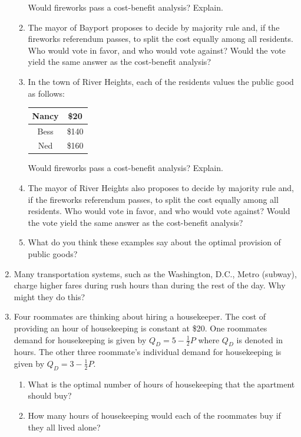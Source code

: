 \documentclass{article}
\begin{document}
\begin{enumerate}
\begin{enumerate}
	Would fireworks pass a cost-benefit analysis? Explain. 
	
	\item The mayor of Bayport proposes to decide by majority rule and, if the fireworks referendum passes, to split the cost equally among all residents. Who would vote in favor, and who would vote against? Would the vote yield the same answer as the cost-benefit analysis?
	
	\item In the town of River Heights, each of the residents values the public good as follows:
	
	\begin{center}
	\begin{tabular}{| c | c |}
	\hline
	Nancy & \$20 \\
	\hline
	Bess & \$140 \\
	\hline
	Ned & \$160 \\
	\hline
	\end{tabular}
	\end{center}
	
	Would fireworks pass a cost-benefit analysis? Explain.
	
	\item The mayor of River Heights also proposes to decide by majority rule and, if the fireworks referendum passes, to split the cost equally among all residents. Who would vote in favor, and who would vote against? Would the vote yield the same answer as the cost-benefit analysis?
	
	\item What do you think these examples say about the optimal provision of public goods?
		
	\end{enumerate}

\item Many transportation systems, such as the Washington, D.C., Metro (subway), charge higher fares during rush hours than during the rest of the day. Why might they do this?

\item Four roommates are thinking about hiring a housekeeper. The cost of providing an hour of housekeeping is constant at \$20. One roommates demand for housekeeping is given by $Q_D = 5 - \frac{1}{2}P$ where $Q_D$ is denoted in hours. The other three roommate's individual demand for housekeeping is given by $Q_D = 3 - \frac{1}{2}P$.

	\begin{enumerate}
	
	\item What is the optimal number of hours of housekeeping that the apartment should buy?
	
	\item How many hours of housekeeping would each of the roommates buy if they all lived alone? 
		
	\end{enumerate} 

\end{enumerate}
\end{document}
